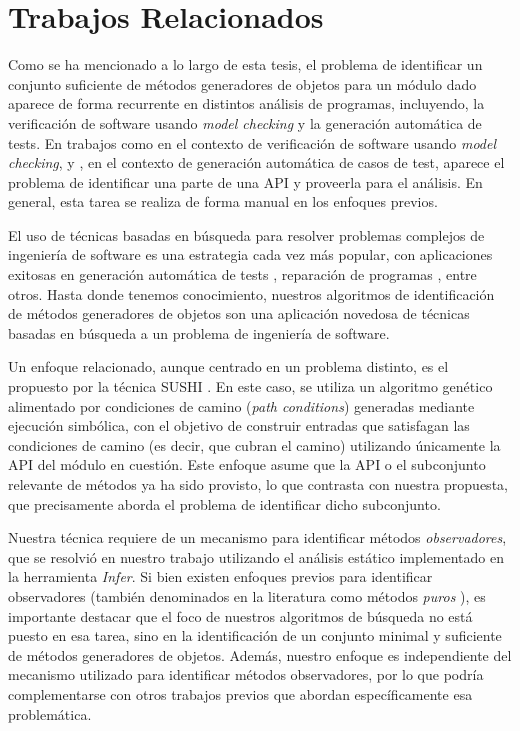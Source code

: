 \chapter[Trabajos Relacionados]{Trabajos Relacionados}
\label{cap:related-work}

Como se ha mencionado a lo largo de esta tesis, el problema de identificar un conjunto suficiente de métodos generadores de objetos 
para un módulo dado aparece de forma recurrente en distintos análisis de
programas, incluyendo, la verificación de software usando \emph{model checking} y la generación automática de tests.
En trabajos como \cite{DBLP:conf/tacas/NoriRTT09,DBLP:conf/tacas/KhurshidPV03} en el contexto de verificación 
de software usando \emph{model checking}, y
\cite{Tillmann:2010,Tillmann:2008,paPacheco07,DBLP:conf/icse/BraioneDMP18}, en
el contexto de generación automática de casos de test, aparece el problema de 
identificar una parte de una API y proveerla para el análisis. En general, esta tarea se realiza de forma manual en los enfoques previos.

El uso de técnicas basadas en búsqueda para resolver problemas complejos de
ingeniería de software es una estrategia cada vez más popular, con aplicaciones
exitosas en generación automática de tests \cite{Fraser:2011}, reparación de programas 
\cite{DBLP:journals/tse/GouesNFW12}, entre otros. Hasta donde tenemos
conocimiento, nuestros algoritmos de identificación de métodos generadores de
objetos son una aplicación novedosa de técnicas basadas en búsqueda a un problema de ingeniería
de software.

Un enfoque relacionado, aunque centrado en un problema distinto, es el propuesto
por la técnica \textsf{SUSHI} 
\cite{DBLP:conf/icse/BraioneDMP18}. En este caso, se utiliza un algoritmo genético alimentado por condiciones de camino 
(\emph{path conditions}) generadas mediante ejecución simbólica, con el objetivo
de construir entradas que satisfagan las condiciones de camino (es decir, que
cubran el camino) utilizando únicamente la API del módulo
en cuestión. Este enfoque asume que la API o el subconjunto relevante de métodos
ya ha sido provisto, lo que contrasta con nuestra propuesta, que precisamente aborda el problema de identificar dicho subconjunto.

Nuestra técnica requiere de un mecanismo para identificar métodos
\emph{observadores}, que se resolvió en nuestro trabajo utilizando el análisis estático 
implementado en la herramienta \emph{Infer}. 
Si bien existen enfoques previos para identificar observadores (también
    denominados en la literatura como métodos \emph{puros}
\cite{Huang:2012,Salcianu:2005}), es importante destacar que el 
foco de nuestros algoritmos de búsqueda no está puesto en esa tarea, sino en la
identificación de un conjunto minimal y suficiente de métodos generadores de objetos.
Además, nuestro enfoque es independiente del mecanismo utilizado para
identificar métodos observadores, por lo que podría 
complementarse con otros trabajos previos que abordan específicamente esa problemática.

